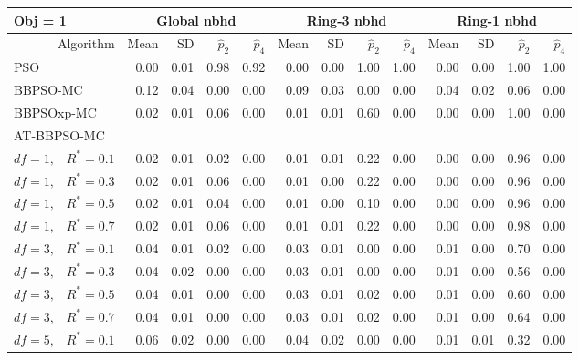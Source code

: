 \documentclass[12pt]{article}
\begin{document}
\begin{appendix}
\begin{table}[ht]
\centering
\footnotesize{
\begin{tabular}{r|rrrr|rrrr|rrrr}
\multicolumn{1}{l}{Obj = 1} & \multicolumn{4}{c}{Global nbhd} & \multicolumn{4}{c}{Ring-3 nbhd} & \multicolumn{4}{c}{Ring-1 nbhd}\\
  \hline
Algorithm & Mean & SD & $\widehat{p}_2$ & $\widehat{p}_4$ & Mean & SD & $\widehat{p}_2$ & $\widehat{p}_4$ & Mean & SD & $\widehat{p}_2$ & $\widehat{p}_4$ \\ 
  \hline
\multicolumn{1}{l|}{PSO} & 0.00 & 0.01 & 0.98 & 0.92 & 0.00 & 0.00 & 1.00 & 1.00 & 0.00 & 0.00 & 1.00 & 1.00 \\ 
  \multicolumn{1}{l|}{BBPSO-MC} & 0.12 & 0.04 & 0.00 & 0.00 & 0.09 & 0.03 & 0.00 & 0.00 & 0.04 & 0.02 & 0.06 & 0.00 \\ 
  \multicolumn{1}{l|}{BBPSOxp-MC} & 0.02 & 0.01 & 0.06 & 0.00 & 0.01 & 0.01 & 0.60 & 0.00 & 0.00 & 0.00 & 1.00 & 0.00 \\ 
\hline
\multicolumn{1}{l|}{AT-BBPSO-MC} &&&&&&&&&&&&\\
  $df = 1,\enspace$ $R^* =0.1$ & 0.02 & 0.01 & 0.02 & 0.00 & 0.01 & 0.01 & 0.22 & 0.00 & 0.00 & 0.00 & 0.96 & 0.00 \\ 
  $df = 1,\enspace$ $R^* =0.3$ & 0.02 & 0.01 & 0.06 & 0.00 & 0.01 & 0.00 & 0.22 & 0.00 & 0.00 & 0.00 & 0.96 & 0.00 \\ 
  $df = 1,\enspace$ $R^* =0.5$ & 0.02 & 0.01 & 0.04 & 0.00 & 0.01 & 0.00 & 0.10 & 0.00 & 0.00 & 0.00 & 0.96 & 0.00 \\ 
  $df = 1,\enspace$ $R^* =0.7$ & 0.02 & 0.01 & 0.06 & 0.00 & 0.01 & 0.01 & 0.22 & 0.00 & 0.00 & 0.00 & 0.98 & 0.00 \\ 
  $df = 3,\enspace$ $R^* =0.1$ & 0.04 & 0.01 & 0.02 & 0.00 & 0.03 & 0.01 & 0.00 & 0.00 & 0.01 & 0.00 & 0.70 & 0.00 \\ 
  $df = 3,\enspace$ $R^* =0.3$ & 0.04 & 0.02 & 0.00 & 0.00 & 0.03 & 0.01 & 0.00 & 0.00 & 0.01 & 0.00 & 0.56 & 0.00 \\ 
  $df = 3,\enspace$ $R^* =0.5$ & 0.04 & 0.01 & 0.00 & 0.00 & 0.03 & 0.01 & 0.02 & 0.00 & 0.01 & 0.00 & 0.60 & 0.00 \\ 
  $df = 3,\enspace$ $R^* =0.7$ & 0.04 & 0.01 & 0.00 & 0.00 & 0.03 & 0.01 & 0.02 & 0.00 & 0.01 & 0.00 & 0.64 & 0.00 \\ 
  $df = 5,\enspace$ $R^* =0.1$ & 0.06 & 0.02 & 0.00 & 0.00 & 0.04 & 0.02 & 0.00 & 0.00 & 0.01 & 0.01 & 0.32 & 0.00 \\ 

\end{tabular}}
\end{table}
\end{appendix}
\end{document}
